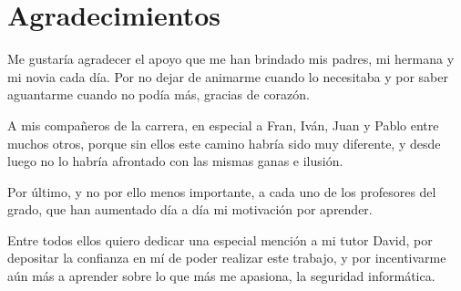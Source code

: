 \chapter*{Agradecimientos}
Me gustaría agradecer el apoyo que me han brindado mis padres, mi
hermana y mi novia cada día. Por no dejar de animarme cuando lo
necesitaba y por saber aguantarme cuando no podía más, gracias de
corazón.

A mis compañeros de la carrera, en especial a Fran, Iván, Juan y Pablo
entre muchos otros, porque sin ellos este camino habría sido muy
diferente, y desde luego no lo habría afrontado con las mismas ganas e
ilusión.

Por último, y no por ello menos importante, a cada uno de los
profesores del grado, que han aumentado día a día mi motivación por
aprender.

Entre todos ellos quiero dedicar una especial mención a mi tutor
David, por depositar la confianza en mí de poder realizar este
trabajo, y por incentivarme aún más a aprender sobre lo que más me
apasiona, la seguridad informática.

